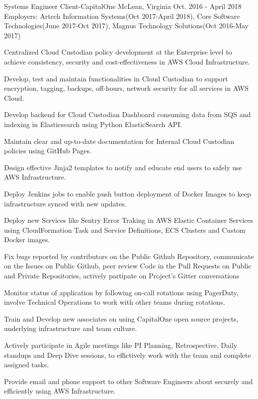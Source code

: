 \begin{cventries}
  \cventryemp
    {Systems Engineer} %
    {Client-CapitalOne} %
    {McLean, Virginia} %
    {Oct. 2016 - April 2018} %
    {Employers: Artech Information Systems(Oct 2017-April 2018), Core Software Technologies(June 2017-Oct 2017), Magnus Technology Solutions(Oct 2016-May 2017)}
    {
      \begin{cvitems} %
        \item {Centralized Cloud Custodian policy development at the Enterprise level to achieve consistency, security and cost-effectiveness in AWS Cloud Infrastructure.}
        \item {Develop, test and maintain functionalities in Cloud Custodian to support encryption, tagging, backups, off-hours, network security for all services in AWS Cloud.}
        \item {Develop backend for Cloud Custodian Dashboard consuming data from SQS and indexing in Elasticsearch using Python ElasticSearch API.}
        \item {Maintain clear and up-to-date documentation for Internal Cloud Custodian policies using GitHub Pages.}
        \item {Design effective Jinja2 templates to notify and educate end users to safely use AWS Infrastructure.}
        \item {Deploy Jenkins jobs to enable push button deployment of Docker Images to keep infrastructure synced with new updates.}
        \item {Deploy new Services like Sentry Error Traking in AWS Elastic Container Services using CloudFormation Task and Service Definitions, ECS Clusters and Custom Docker images.}
        \item {Fix bugs reported by contributors on the Public Github Repository, communicate on the Issues on Public Github, peer review Code in the Pull Requests on Public and Private Repositories, actively partipate on Project's Gitter conversations}
        \item {Monitor status of application by following on-call rotations using PagerDuty, involve Technical Operations to work with other teams during rotations.}
        \item {Train and Develop new associates on using CapitalOne open source projects, underlying infrastructure and team culture.}
        \item {Actively participate in Agile meetings like PI Planning, Retrospective, Daily standups and Deep Dive sessions, to effictively work with the team and complete assigned tasks.}
        \item {Provide email and phone support to other Software Engineers about securely and efficiently using AWS Infrastructure.}
      \end{cvitems}
    }


\end{cventries}
